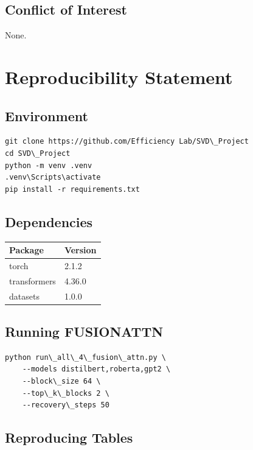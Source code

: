 \subsection{Conflict of Interest}

None.



\section{Reproducibility Statement}

\subsection{Environment}

\begin{lstlisting}
git clone https://github.com/Efficiency Lab/SVD\_Project
cd SVD\_Project
python -m venv .venv
.venv\Scripts\activate
pip install -r requirements.txt
\end{lstlisting}

\subsection{Dependencies}

\begin{table}[H]
\centering
\small
\begin{tabular}{ll}
\toprule
\textbf{Package} & \textbf{Version} \\
\midrule
torch & 2.1.2 \\
transformers & 4.36.0 \\
datasets & 1.0.0 \\
\bottomrule
\end{tabular}
\end{table}

\subsection{Running FUSIONATTN}

\begin{lstlisting}
python run\_all\_4\_fusion\_attn.py \
    --models distilbert,roberta,gpt2 \
    --block\_size 64 \
    --top\_k\_blocks 2 \
    --recovery\_steps 50
\end{lstlisting}

\subsection{Reproducing Tables}

